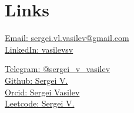 \section{Links}
\href{mailto:sergei.vl.vasilev@gmail.com}{ Email: sergei.vl.vasilev@gmail.com} \\%

\href{https://www.linkedin.com/in/vasilevsv}{  LinkedIn: vasilevsv} %

\href{https://t.me/sergei\_v\_vasilev}{ Telegram: @sergei\_v\_vasilev} \\%

\href{https://github.com/kyramino}{ Github: Sergei V.}\\ %

\href{https://orcid.org/0000-0001-5870-8966}{ Orcid: Sergei Vasilev} \\%

\href{https://leetcode.com/u/kyramino}{ Leetcode: Sergei V.} \\%

\sectionsep